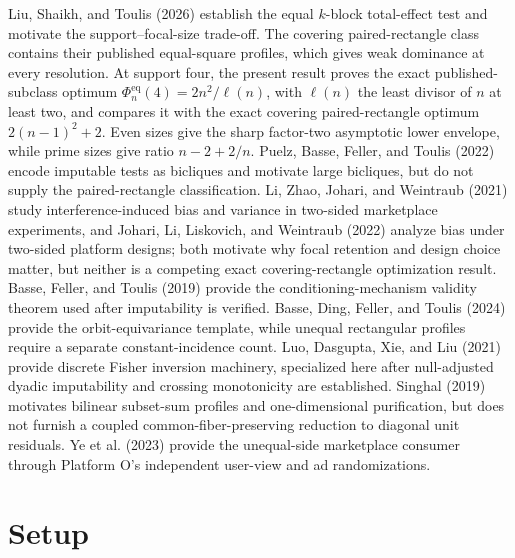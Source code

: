 \documentclass{article}
\begin{document}
Liu, Shaikh, and Toulis (2026) establish the equal \(k\)-block total-effect test and motivate the support--focal-size trade-off. The covering paired-rectangle class contains their published equal-square profiles, which gives weak dominance at every resolution. At support four, the present result proves the exact published-subclass optimum \(\Phi_n^{\mathrm{eq}}(4)=2n^2/\ell(n)\), with \(\ell(n)\) the least divisor of \(n\) at least two, and compares it with the exact covering paired-rectangle optimum \(2(n-1)^2+2\). Even sizes give the sharp factor-two asymptotic lower envelope, while prime sizes give ratio \(n-2+2/n\). Puelz, Basse, Feller, and Toulis (2022) encode imputable tests as bicliques and motivate large bicliques, but do not supply the paired-rectangle classification. Li, Zhao, Johari, and Weintraub (2021) study interference-induced bias and variance in two-sided marketplace experiments, and Johari, Li, Liskovich, and Weintraub (2022) analyze bias under two-sided platform designs; both motivate why focal retention and design choice matter, but neither is a competing exact covering-rectangle optimization result. Basse, Feller, and Toulis (2019) provide the conditioning-mechanism validity theorem used after imputability is verified. Basse, Ding, Feller, and Toulis (2024) provide the orbit-equivariance template, while unequal rectangular profiles require a separate constant-incidence count. Luo, Dasgupta, Xie, and Liu (2021) provide discrete Fisher inversion machinery, specialized here after null-adjusted dyadic imputability and crossing monotonicity are established. Singhal (2019) motivates bilinear subset-sum profiles and one-dimensional purification, but does not furnish a coupled common-fiber-preserving reduction to diagonal unit residuals. Ye et al. (2023) provide the unequal-side marketplace consumer through Platform O's independent user-view and ad randomizations.

\section{Setup}
\end{document}
